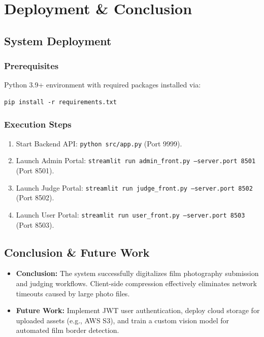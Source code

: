 \chapter{Deployment \& Conclusion}

\section{System Deployment}

\subsection{Prerequisites}
Python 3.9+ environment with required packages installed via:
\begin{verbatim}
pip install -r requirements.txt
\end{verbatim}

\subsection{Execution Steps}
\begin{enumerate}
    \item Start Backend API: \texttt{python src/app.py} (Port 9999).
    \item Launch Admin Portal: \texttt{streamlit run admin\_front.py --server.port 8501} (Port 8501).
    \item Launch Judge Portal: \texttt{streamlit run judge\_front.py --server.port 8502} (Port 8502).
    \item Launch User Portal: \texttt{streamlit run user\_front.py --server.port 8503} (Port 8503).
\end{enumerate}

\section{Conclusion \& Future Work}
\begin{itemize}
    \item \textbf{Conclusion:} The system successfully digitalizes film photography submission and judging workflows. Client-side compression effectively eliminates network timeouts caused by large photo files.
    \item \textbf{Future Work:} Implement JWT user authentication, deploy cloud storage for uploaded assets (e.g., AWS S3), and train a custom vision model for automated film border detection.
\end{itemize}